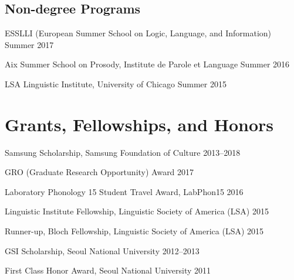 \documentclass[letterpaper]{article}
\renewenvironment{itemize}{
  \begin{list}{}{
    \setlength{\leftmargin}{1.5em}
  }
}{
  \end{list}
}
\begin{document}
\subsection*{Non-degree Programs}

\begin{itemize}\itemsep -1pt
\item ESSLLI (European Summer School on Logic, Language, and Information) \hfill Summer 2017
\item Aix Summer School on Prosody, Institute de Parole et Language \hfill Summer 2016
\item LSA Linguistic Institute, University of Chicago \hfill Summer 2015

\end{itemize}


\section*{Grants, Fellowships, and Honors}

\begin{itemize}\itemsep -1pt

\item Samsung Scholarship, Samsung Foundation of Culture \hfill 2013--2018

\item GRO (Graduate Research Opportunity) Award \hfill 2017

\item Laboratory Phonology 15 Student Travel Award, LabPhon15 \hfill 2016

\item Linguistic Institute Fellowship, Linguistic Society of America (LSA) \hfill 2015

\item Runner-up, Bloch Fellowship, Linguistic Society of America (LSA) \hfill 2015

\item GSI Scholarship, Seoul National University \hfill 2012--2013

\item First Class Honor Award, Seoul National University \hfill 2011

\end{itemize}

\end{document}
